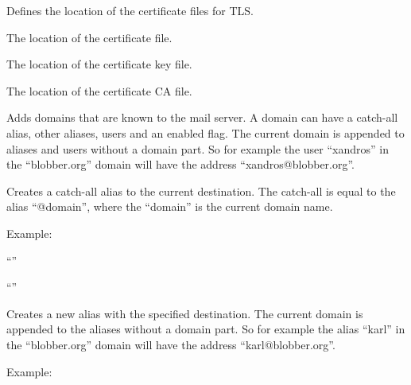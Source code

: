 
Defines the location of the certificate files for TLS.


The location of the certificate file.


The location of the certificate key file.


The location of the certificate CA file.


Adds domains that are known to the mail server. A domain can have a catch-all
alias, other aliases, users and an enabled flag. The current domain is appended
to aliases and users without a domain part. So for example the user ``xandros''
in the ``blobber.org'' domain will have the address ``xandros@blobber.org''.


Creates a catch-all alias to the current destination. The catch-all is equal
to the alias ``@domain'', where the ``domain'' is the current domain name.

Example:

\begin{compactitem}
\item ``''
\item ``''
\end{compactitem}


Creates a new alias with the specified destination. The current domain is appended
to the aliases without a domain part. So for example the alias ``karl''
in the ``blobber.org'' domain will have the address ``karl@blobber.org''.

Example:

